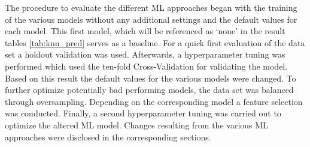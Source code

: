 The procedure to evaluate the different ML approaches began with the training of the various models without any additional settings and the default values for each model. This first model, which will be referenced as \enquote*{none} in the result tables \ref{tab:knn_pred} serves as a baseline. For a quick first evaluation of the data set a holdout validation was used. Afterwards, a hyperparameter tuning was performed which used the ten-fold Cross-Validation for validating the model. %
Based on this result the default values for the various models were changed. To further optimize potentially bad performing models, the data set was balanced through oversampling. Depending on the corresponding model a feature selection was conducted. Finally, a second hyperparameter tuning was carried out to optimize the altered ML model. Changes resulting from the various ML approaches were disclosed in the corresponding sections.


